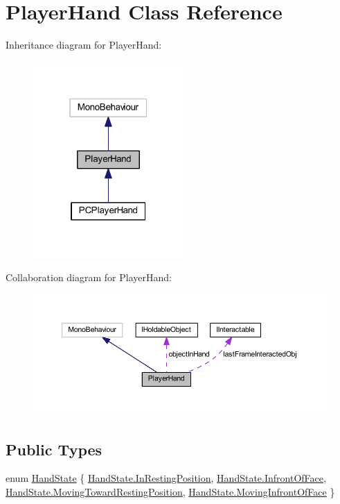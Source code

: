 \hypertarget{class_player_hand}{}\section{Player\+Hand Class Reference}
\label{class_player_hand}


Inheritance diagram for Player\+Hand\+:
\nopagebreak
\begin{figure}[H]
\begin{center}
\leavevmode
\includegraphics[width=163pt]{class_player_hand__inherit__graph}
\end{center}
\end{figure}


Collaboration diagram for Player\+Hand\+:
\nopagebreak
\begin{figure}[H]
\begin{center}
\leavevmode
\includegraphics[width=350pt]{class_player_hand__coll__graph}
\end{center}
\end{figure}
\subsection*{Public Types}
\begin{DoxyCompactItemize}
\item 
enum \mbox{\hyperlink{class_player_hand_a1af76750da713cbc88856161d8d5ac0e}{Hand\+State}} \{ \mbox{\hyperlink{class_player_hand_a1af76750da713cbc88856161d8d5ac0eae9472019d82c6986ba42e1c6c9ddd812}{Hand\+State.\+In\+Resting\+Position}}, 
\mbox{\hyperlink{class_player_hand_a1af76750da713cbc88856161d8d5ac0ea0ffcf44fe0ab61c236ab3692a7cb3a22}{Hand\+State.\+Infront\+Of\+Face}}, 
\mbox{\hyperlink{class_player_hand_a1af76750da713cbc88856161d8d5ac0eae19d086cff66ea84fd45f01a2122af60}{Hand\+State.\+Moving\+Toward\+Resting\+Position}}, 
\mbox{\hyperlink{class_player_hand_a1af76750da713cbc88856161d8d5ac0eac9696ab2c297170cfe81d7ace9f096a6}{Hand\+State.\+Moving\+Infront\+Of\+Face}}
 \}
\end{DoxyCompactItemize}

